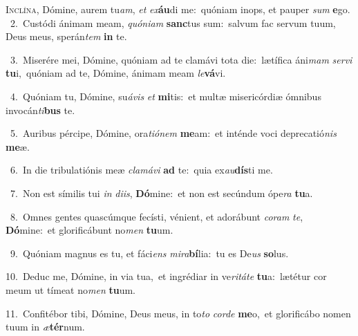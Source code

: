 \lettrine{\initial\textcolor{\initialcolor}{I}}{nclína,} Dómine, aurem tu\-\textit{am}\-, \textit{et} \textit{ex}\-\textbf{áu}di me:~\star quóniam inops, et pauper \textit{sum} \textbf{e}\-go.\\
{\numbfont\textcolor{\numbcolor}{~2.}}~Custódi ánimam meam, \textit{quón}\-\textit{i}\textit{am} \textbf{sanc}\-tus sum:~\star salvum fac servum tuum, Deus meus, sperán\textit{tem} \textbf{in} te.\par
{\numbfont\textcolor{\numbcolor}{~3.}}~Miserére mei, Dómine, quóniam ad te clamávi tota die:~\dagger lætífica áni\textit{mam} \textit{ser}\-\textit{vi} \textbf{tu}\-i,~\star quóniam ad te, Dómine, ánimam meam \textit{le}\-\textbf{vá}vi.\par
{\numbfont\textcolor{\numbcolor}{~4.}}~Quóniam tu, Dómine, su\-\textit{á}\-\textit{vis} \textit{et} \textbf{mi}\-tis:~\star et multæ misericórdiæ ómnibus invocán\-\textit{ti}\-\textbf{bus} te.\par
{\numbfont\textcolor{\numbcolor}{~5.}}~Auribus pércipe, Dómine, ora\-\textit{ti}\-\textit{ó}\textit{nem} \textbf{me}\-am:~\star et inténde voci deprecatió\textit{nis} \textbf{me}\-æ.\par
{\numbfont\textcolor{\numbcolor}{~6.}}~In die tribulatiónis meæ \textit{cla}\-\textit{má}\textit{vi} \textbf{ad} te:~\star quia ex\-\textit{au}\-\textbf{dís}ti me.\par
{\numbfont\textcolor{\numbcolor}{~7.}}~Non est símilis tui \textit{in} \textit{di}\-\textit{is}, \textbf{Dó}\-mine:~\star et non est secúndum ópe\textit{ra} \textbf{tu}\-a.\par
{\numbfont\textcolor{\numbcolor}{~8.}}~Omnes gentes quascúmque fecísti, vénient, et adorábunt \textit{co}\-\textit{ram} \textit{te}\-, \textbf{Dó}\-mine:~\star et glorificábunt no\textit{men} \textbf{tu}\-um.\par
{\numbfont\textcolor{\numbcolor}{~9.}}~Quóniam magnus es tu, et fáci\textit{ens} \textit{mi}\-\textit{ra}\textbf{bí}lia:~\star tu es De\textit{us} \textbf{so}\-lus.\par
{\numbfont\textcolor{\numbcolor}{10.}}~Deduc me, Dómine, in via tua,~\dagger et ingrédiar in ve\-\textit{ri}\-\textit{tá}\textit{te} \textbf{tu}\-a:~\star lætétur cor meum ut tímeat no\textit{men} \textbf{tu}\-um.\par
{\numbfont\textcolor{\numbcolor}{11.}}~Confitébor tibi, Dómine, Deus meus, in to\textit{to} \textit{cor}\-\textit{de} \textbf{me}\-o,~\star et glorificábo nomen tuum in \textit{æ}\-\textbf{tér}num.\par

